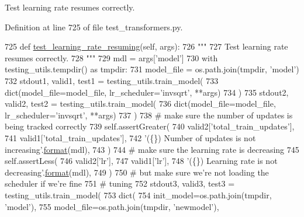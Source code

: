 \begin{DoxyVerb}Test learning rate resumes correctly.
\end{DoxyVerb}
 

Definition at line 725 of file test\+\_\+transformers.\+py.


\begin{DoxyCode}
725 \textcolor{keyword}{def }\hyperlink{namespacetests_1_1test__transformers_a8d6cf0022229f5deba37f23f30601117}{test\_learning\_rate\_resuming}(self, args):
726     \textcolor{stringliteral}{"""}
727 \textcolor{stringliteral}{    Test learning rate resumes correctly.}
728 \textcolor{stringliteral}{    """}
729     mdl = args[\textcolor{stringliteral}{'model'}]
730     with testing\_utils.tempdir() \textcolor{keyword}{as} tmpdir:
731         model\_file = os.path.join(tmpdir, \textcolor{stringliteral}{'model'})
732         stdout1, valid1, test1 = testing\_utils.train\_model(
733             dict(model\_file=model\_file, lr\_scheduler=\textcolor{stringliteral}{'invsqrt'}, **args)
734         )
735         stdout2, valid2, test2 = testing\_utils.train\_model(
736             dict(model\_file=model\_file, lr\_scheduler=\textcolor{stringliteral}{'invsqrt'}, **args)
737         )
738         \textcolor{comment}{# make sure the number of updates is being tracked correctly}
739         self.assertGreater(
740             valid2[\textcolor{stringliteral}{'total\_train\_updates'}],
741             valid1[\textcolor{stringliteral}{'total\_train\_updates'}],
742             \textcolor{stringliteral}{'(\{\}) Number of updates is not increasing'}.\hyperlink{namespaceparlai_1_1chat__service_1_1services_1_1messenger_1_1shared__utils_a32e2e2022b824fbaf80c747160b52a76}{format}(mdl),
743         )
744         \textcolor{comment}{# make sure the learning rate is decreasing}
745         self.assertLess(
746             valid2[\textcolor{stringliteral}{'lr'}],
747             valid1[\textcolor{stringliteral}{'lr'}],
748             \textcolor{stringliteral}{'(\{\}) Learning rate is not decreasing'}.\hyperlink{namespaceparlai_1_1chat__service_1_1services_1_1messenger_1_1shared__utils_a32e2e2022b824fbaf80c747160b52a76}{format}(mdl),
749         )
750         \textcolor{comment}{# but make sure we're not loading the scheduler if we're fine}
751         \textcolor{comment}{# tuning}
752         stdout3, valid3, test3 = testing\_utils.train\_model(
753             dict(
754                 init\_model=os.path.join(tmpdir, \textcolor{stringliteral}{'model'}),
755                 model\_file=os.path.join(tmpdir, \textcolor{stringliteral}{'newmodel'}),

\end{DoxyCode}
